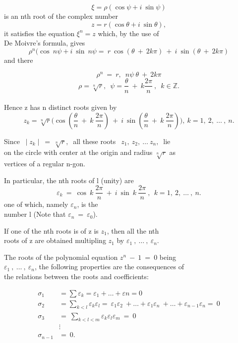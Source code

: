 \documentclass[11pt]{amsbook}
\begin{document}
\[
    \xi = \rho(\cos\psi+ i\: \sin\psi)
\]
is an nth root of the complex number
\[
    z = r (\cos\theta + i\: \sin\theta),
\]
it satisfies the equation \:\:  $\xi^n = z$  \:\: which, by the use of
\\De Moivre's formula, gives 
\[
    \rho^n(\cos\:n\psi+i\:\sin\:n\psi=\:r\:\cos(\theta\:+\:2k\pi)\:+\:i\:\sin(\theta\:+\:2k\pi)   
\]
and there

\[
    \rho^n\:=\:r,\enspace  n\psi\:\theta\:+\:2k\pi
\]
\[
    \rho=\sqrt[n]{r},\enspace \psi = \frac{\theta}{n} \:+\:k\frac{2\pi}{n}\:,\enspace k\in  \mathbb{Z}.
\]
\\Hence z has n distinct roots given by
\[
    z_{k} = \sqrt[n]{r} \Big( \cos(\frac{\theta}{n} \:+\:k\:\frac{2\pi}{n})\:+\:i\:\sin(\frac{\theta}{n} \:+\:k\:\frac{2\pi}{n}) \Big) , \:k=1,\:2,\:\dots \: ,\:n.
\]

    Since $\: \mid z_{k} \mid \:=\:\sqrt[n]{r},\:$ all these roots $\:\:z_{1},\:z_{2},\:\dots\:z_{n},\:$ lie
\\on the circle with center at the origin and radius  $\sqrt[n]{r}$  as \\vertices of a regular n-gon.

In particular, the nth roots of l (unity) are 
\[
    \varepsilon_{k} \: = \: \cos\:k\:\frac{2\pi}{n} \:+\:i\:\sin\: k\:\frac{2\pi}{n} \:,\: \:k=1,\:2,\:\dots \: ,\:n.
\]
one of which, namely $\varepsilon_{n}$,  is the
\\number l (Note that  $\varepsilon_{n}\:=\:\varepsilon_{0}$).

If one of the nth roots is of z is $z_{1}$, then all the nth 
\\roots of z are obtained multipling $z_{1}$ by $\varepsilon_{1}\:,\:\dots\:,\:\varepsilon_{n}.$

The roots of the polynomial equation $z^n\:-\:1\:=\:0$ being
\\$\varepsilon_{1}\:,\:\dots\:,\:\varepsilon_{n}$, the following properties are the consequences of
\\the relations between the roots and coefficients:


\begin{align*}
    \sigma_{1} 
        &= \sum \varepsilon_{k}
         = \varepsilon_{1} + \dots +\varepsilon{n}
         =0\\
    \sigma_{2} 
        &= \sum_{k<l}\varepsilon_{k}\varepsilon_{l}
         =\:\varepsilon_{1}\varepsilon_{2}\:+\dots+\varepsilon_{1}\varepsilon_{n}\:+\dots+\varepsilon_{n-1}\varepsilon_{n}
         =\:0\\
    \sigma_{3} 
        &=\:\sum_{k<l<m}\varepsilon_{k}\varepsilon_{l}\varepsilon_{m}\:
         =\:0\\
    &\vdots\\
    \sigma_{n-1}
        &=\:0.
\end{align*}
\end{document}
